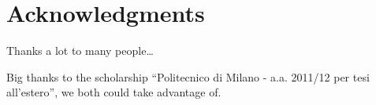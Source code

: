 
\bigskip

\begingroup
\let\clearpage\relax
\let\cleardoublepage\relax
\let\cleardoublepage\relax
\chapter*{Acknowledgments}
Thanks a lot to many people\ldots

\bigskip

Big thanks to the scholarship \enquote{Politecnico di Milano -
a.a. 2011/12 per tesi all’estero}, we both could take advantage
of.

\endgroup
